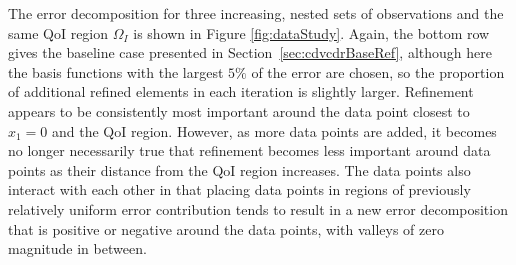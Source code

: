 The error decomposition for three increasing, nested sets of observations and the same QoI region $\Omega_I$ is shown in Figure \ref{fig:dataStudy}. Again, the bottom row gives the baseline case presented in Section~\ref{sec:cdvcdrBaseRef}, although here the basis functions with the largest $5\%$ of the error are chosen, so the proportion of additional refined elements in each iteration is slightly larger. Refinement appears to be consistently most important around the data point closest to $x_1=0$ and the QoI region. However, as more data points are added, it becomes no longer necessarily true that refinement becomes less important around data points as their distance from the QoI region increases. The data points also interact with each other in that placing data points in regions of previously relatively uniform error contribution tends to result in a new error decomposition that is positive or negative around the data points, with valleys of zero magnitude in between.

